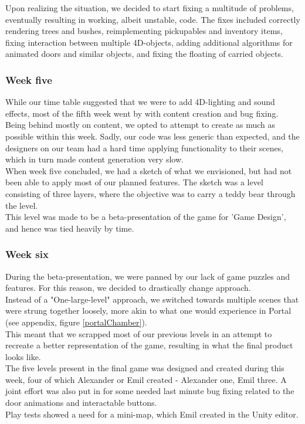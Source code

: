 Upon realizing the situation, we decided to start fixing a multitude of problems, eventually resulting in working, albeit unstable, code. The fixes included correctly rendering trees and bushes, reimplementing pickupables and inventory items, fixing interaction between multiple 4D-objects, adding additional algorithms for animated doors and similar objects, and fixing the floating of carried objects.

\subsubsection{Week five}
While our time table suggested that we were to add 4D-lighting and sound effects, most of the fifth week went by with content creation and bug fixing.\\

Being behind mostly on content, we opted to attempt to create as much as possible within this week. Sadly, our code was less generic than expected, and the designers on our team had a hard time applying functionality to their scenes, which in turn made content generation very slow.\\

When week five concluded, we had a sketch of what we envisioned, but had not been able to apply most of our planned features. The sketch was a level consisting of three layers, where the objective was to carry a teddy bear through the level.\\

This level was made to be a beta-presentation of the game for 'Game Design', and hence was tied heavily by time.\\

\subsubsection{Week six}
During the beta-presentation, we were panned by our lack of game puzzles and features. For this reason, we decided to drastically change approach.\\

Instead of a "One-large-level" approach, we switched towards multiple scenes that were strung together loosely, more akin to what one would experience in Portal\cite{portalGame} (see appendix, figure \ref{portalChamber}).\\

This meant that we scrapped most of our previous levels in an attempt to recreate a better representation of the game, resulting in what the final product looks like.\\

The five levels present in the final game was designed and created during this week, four of which Alexander or Emil created - Alexander one, Emil three. A joint effort was also put in for some needed last minute bug fixing related to the door animations and interactable buttons.\\

Play tests showed a need for a mini-map, which Emil created in the Unity editor. 
